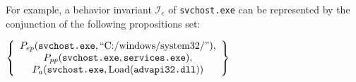 
For example, a behavior invariant $\mathcal{I}_e$ of \texttt{svchost.exe} can be represented by the conjunction of the following propositions set: 

\begin{center}
$ \left\{
\begin{array}{c}
P_{ep}(\texttt{svchost.exe}, \text{``C:/windows/system32/''}),\\
 P_{pp}(\texttt{svchost.exe}, \texttt{services.exe}),\\
 P_{a}(\texttt{svchost.exe}, \text{Load(\texttt{advapi32.dll})})
\end{array} \right\}$
\end{center}


